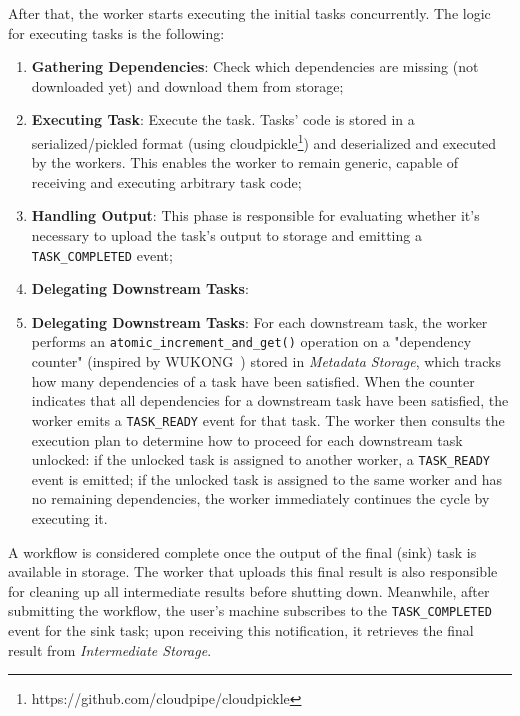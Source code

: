 \documentclass[conference]{IEEEtran}
\begin{document}
After that, the worker starts executing the initial tasks concurrently. The logic for executing tasks is the following:
\begin{enumerate}
    \item \textbf{Gathering Dependencies}: Check which dependencies are missing (not downloaded yet) and download them from storage;
    \item \textbf{Executing Task}: Execute the task. Tasks' code is stored in a serialized/pickled format (using cloudpickle\footnote{https://github.com/cloudpipe/cloudpickle}) and deserialized and executed by the workers. This enables the worker to remain generic, capable of receiving and executing arbitrary task code;
    \item \textbf{Handling Output}: This phase is responsible for evaluating whether it's necessary to upload the task's output to storage and emitting a \texttt{TASK\_COMPLETED} event;
    \item \textbf{Delegating Downstream Tasks}: \item \textbf{Delegating Downstream Tasks}: For each downstream task, the worker performs an \texttt{atomic\_increment\_and\_get()} operation on a "dependency counter" (inspired by WUKONG~\cite{wukong_2}) stored in \textit{Metadata Storage}, which tracks how many dependencies of a task have been satisfied. When the counter indicates that all dependencies for a downstream task have been satisfied, the worker emits a \texttt{TASK\_READY} event for that task. The worker then consults the execution plan to determine how to proceed for each downstream task unlocked: if the unlocked task is assigned to another worker, a \texttt{TASK\_READY} event is emitted; if the unlocked task is assigned to the same worker and has no remaining dependencies, the worker immediately continues the cycle by executing it.
\end{enumerate}


A workflow is considered complete once the output of the final (sink) task is available in storage. The worker that uploads this final result is also responsible for cleaning up all intermediate results before shutting down. Meanwhile, after submitting the workflow, the user's machine subscribes to the \texttt{TASK\_COMPLETED} event for the sink task; upon receiving this notification, it retrieves the final result from \textit{Intermediate Storage}.
\end{document}
